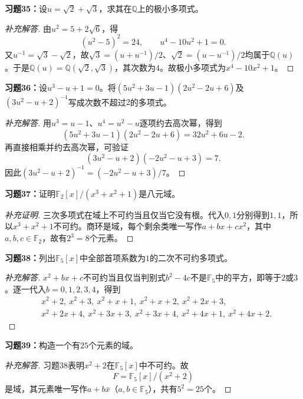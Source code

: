 \begin{problem}
\textbf{习题35：}设$u=\sqrt2+\sqrt3$，求其在$\mathbb Q$上的极小多项式。
\end{problem}
\begin{proof}[补充解答]
由$u^2=5+2\sqrt6$，得
\[
(u^2-5)^2=24,
\qquad u^4-10u^2+1=0.
\]
又$u^{-1}=\sqrt3-\sqrt2$，故$\sqrt3=(u+u^{-1})/2$、$\sqrt2=(u-u^{-1})/2$均属于$\mathbb Q(u)$。于是$\mathbb Q(u)=\mathbb Q(\sqrt2,\sqrt3)$，其次数为$4$。故极小多项式为$x^4-10x^2+1$。
\end{proof}

\begin{problem}
\textbf{习题36：}设$u^3-u+1=0$。将$(5u^2+3u-1)(2u^2-2u+6)$及$(3u^2-u+2)^{-1}$写成次数不超过$2$的多项式。
\end{problem}
\begin{proof}[补充解答]
用$u^3=u-1$、$u^4=u^2-u$逐项约去高次幂，得到
\[
(5u^2+3u-1)(2u^2-2u+6)=32u^2+6u-2.
\]
再直接相乘并约去高次幂，可验证
\[
(3u^2-u+2)(-2u^2-u+3)=7.
\]
因此$(3u^2-u+2)^{-1}=(-2u^2-u+3)/7$。
\end{proof}

\begin{problem}
\textbf{习题37：}证明$\mathbb F_2[x]/(x^3+x^2+1)$是八元域。
\end{problem}
\begin{proof}[补充证明]
三次多项式在域上不可约当且仅当它没有根。代入$0,1$分别得到$1,1$，所以$x^3+x^2+1$不可约。商环是域，每个剩余类唯一写作$a+bx+cx^2$，其中$a,b,c\in\mathbb F_2$，故有$2^3=8$个元素。
\end{proof}

\begin{problem}
\textbf{习题38：}列出$\mathbb F_5[x]$中全部首项系数为$1$的二次不可约多项式。
\end{problem}
\begin{proof}[补充解答]
$x^2+bx+c$不可约当且仅当判别式$b^2-4c$不是$\mathbb F_5$中的平方，即等于$2$或$3$。逐一代入$b=0,1,2,3,4$，得到
\begin{align*}
&x^2+2,\ x^2+3,\ x^2+x+1,\ x^2+x+2,\ x^2+2x+3,\\
&x^2+2x+4,\ x^2+3x+3,\ x^2+3x+4,\ x^2+4x+1,\ x^2+4x+2.
\end{align*}
\end{proof}

\begin{problem}
\textbf{习题39：}构造一个有$25$个元素的域。
\end{problem}
\begin{proof}[补充解答]
习题38表明$x^2+2$在$\mathbb F_5[x]$中不可约。故
\[
F=\mathbb F_5[x]/(x^2+2)
\]
是域，其元素唯一写作$a+b\bar x$（$a,b\in\mathbb F_5$），共有$5^2=25$个。
\end{proof}

